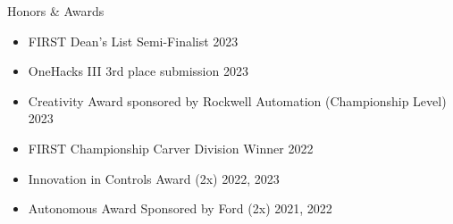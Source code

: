 \documentclass[
	11pt, %
]{resume} %
\begin{document}

\begin{rSection}{Honors \& Awards}

    \begin{itemize}
        \setlength\itemsep{-0.7em} %
        \item FIRST Dean's List Semi-Finalist \hfill 2023
        \item OneHacks III 3rd place submission \hfill 2023
        \item Creativity Award sponsored by Rockwell Automation (Championship Level) \hfill 2023
        \item FIRST Championship Carver Division Winner \hfill 2022
        \item Innovation in Controls Award (2x) \hfill 2022, 2023
        \item Autonomous Award Sponsored by Ford (2x) \hfill 2021, 2022

    \end{itemize}

\end{rSection}





\end{document}
